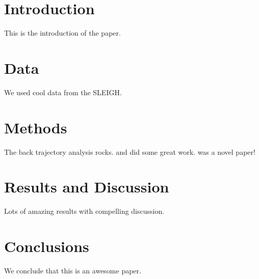 \documentclass{agujournal2019}
\begin{document}
\section{Introduction}

This is the introduction of the paper.

\section{Data}

We used cool data from the SLEIGH.

\section{Methods}

The back trajectory analysis rocks. \cite{knutesonAtmosphericEmittedRadiance2004a} and \cite{knutesonAtmosphericEmittedRadiance2004b} did some great work. \cite{waldenFirstMeasurementsInfrared2005} was a novel paper!

\section{Results and Discussion}

Lots of amazing results with compelling discussion. \href{xref:spec\#Fig1}{}

\section{Conclusions}

We conclude that this is an awesome paper.



\end{document}
